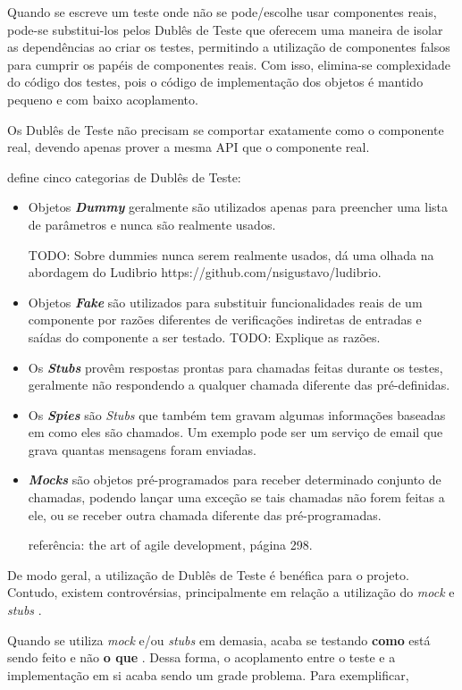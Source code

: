 Quando se escreve um teste onde não se pode/escolhe usar componentes reais, pode-se substitui-los pelos Dublês de Teste que oferecem uma maneira de isolar as dependências ao criar os testes, permitindo a utilização de componentes falsos para cumprir os papéis de componentes reais. Com isso, elimina-se complexidade do código dos testes, pois o código de implementação dos objetos é mantido pequeno e com baixo acoplamento.

Os Dublês de Teste não precisam se comportar exatamente como o componente real, devendo apenas prover a mesma API que o componente real.

 define cinco categorias de Dublês de Teste:

\begin{itemize}
\item
Objetos \textbf{\textit{Dummy}} geralmente são utilizados apenas para preencher uma lista de parâmetros e nunca são realmente usados.

TODO: Sobre dummies nunca serem realmente usados, dá uma olhada na abordagem do Ludibrio https://github.com/nsigustavo/ludibrio.

\item
Objetos \textbf{\textit{Fake}} são utilizados para substituir funcionalidades reais de um componente por razões diferentes de verificações indiretas de entradas e saídas do componente a ser testado. TODO: Explique as razões.

\item
Os \textbf{\textit{Stubs}} provêm respostas prontas para chamadas feitas durante os testes, geralmente não respondendo a qualquer   chamada diferente
das pré-definidas.

\item
Os \textbf{\textit{Spies}} são \textit{Stubs} que também tem gravam algumas informações baseadas em como eles são chamados. Um exemplo   pode ser um serviço de email que grava quantas mensagens foram enviadas.

\item
\textbf{\textit{Mocks}} são objetos pré-programados para receber determinado conjunto de chamadas, podendo lançar uma exceção se tais chamadas não forem feitas a ele, ou se receber outra chamada diferente das pré-programadas.

referência: the art of agile development, página 298.
\end{itemize}

De modo geral, a utilização de Dublês de Teste é benéfica para o projeto. Contudo, existem controvérsias, principalmente em relação a utilização do \textit{mock} e \textit{stubs} \cite{MocksArentStubs}.

Quando se utiliza \textit{mock} e/ou \textit{stubs} em demasia, acaba se testando \textbf{como} está sendo feito e não \textbf{o que} \cite{UnitForAReason}. Dessa forma, o acoplamento entre o teste e a implementação em si acaba sendo um grade problema. Para exemplificar,

